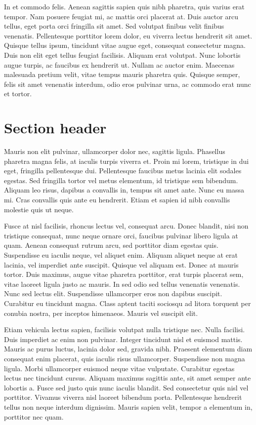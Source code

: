 \documentclass{article}
\begin{document}
In et commodo felis. Aenean sagittis sapien quis nibh pharetra, quis varius erat tempor. Nam posuere feugiat mi, ac mattis orci placerat at. Duis auctor arcu tellus, eget porta orci fringilla sit amet. Sed volutpat finibus velit finibus venenatis. Pellentesque porttitor lorem dolor, eu viverra lectus hendrerit sit amet. Quisque tellus ipsum, tincidunt vitae augue eget, consequat consectetur magna. Duis non elit eget tellus feugiat facilisis. Aliquam erat volutpat. Nunc lobortis augue turpis, ac faucibus ex hendrerit ut. Nullam ac auctor enim. Maecenas malesuada pretium velit, vitae tempus mauris pharetra quis. Quisque semper, felis sit amet venenatis interdum, odio eros pulvinar urna, ac commodo erat nunc et tortor.

\section{Section header}

Mauris non elit pulvinar, ullamcorper dolor nec, sagittis ligula. Phasellus pharetra magna felis, at iaculis turpis viverra et. Proin mi lorem, tristique in dui eget, fringilla pellentesque dui. Pellentesque faucibus metus lacinia elit sodales egestas. Sed fringilla tortor vel metus elementum, id tristique sem bibendum. Aliquam leo risus, dapibus a convallis in, tempus sit amet ante. Nunc eu massa mi. Cras convallis quis ante eu hendrerit. Etiam et sapien id nibh convallis molestie quis ut neque.

Fusce at nisl facilisis, rhoncus lectus vel, consequat arcu. Donec blandit, nisi non tristique consequat, nunc neque ornare orci, faucibus pulvinar libero ligula at quam. Aenean consequat rutrum arcu, sed porttitor diam egestas quis. Suspendisse eu iaculis neque, vel aliquet enim. Aliquam aliquet neque at erat lacinia, vel imperdiet ante suscipit. Quisque vel aliquam est. Donec at mauris tortor. Duis maximus, augue vitae pharetra porttitor, erat turpis placerat sem, vitae laoreet ligula justo ac mauris. In sed odio sed tellus venenatis venenatis. Nunc sed lectus elit. Suspendisse ullamcorper eros non dapibus suscipit. Curabitur eu tincidunt magna. Class aptent taciti sociosqu ad litora torquent per conubia nostra, per inceptos himenaeos. Mauris vel suscipit elit.

Etiam vehicula lectus sapien, facilisis volutpat nulla tristique nec. Nulla facilisi. Duis imperdiet ac enim non pulvinar. Integer tincidunt nisl et euismod mattis. Mauris ac purus luctus, lacinia dolor sed, gravida nibh. Praesent elementum diam consequat enim placerat, quis iaculis risus ullamcorper. Suspendisse non magna ligula. Morbi ullamcorper euismod neque vitae vulputate. Curabitur egestas lectus nec tincidunt cursus. Aliquam maximus sagittis ante, sit amet semper ante lobortis a. Fusce sed justo quis nunc iaculis blandit. Sed consectetur quis nisl vel porttitor. Vivamus viverra nisl laoreet bibendum porta. Pellentesque hendrerit tellus non neque interdum dignissim. Mauris sapien velit, tempor a elementum in, porttitor nec quam.
\end{document}
